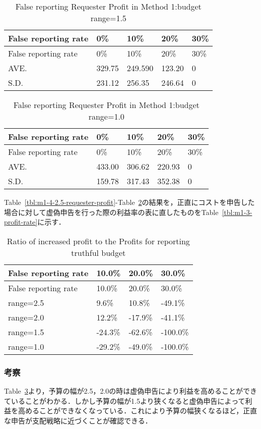 \hypertarget{tbl:m1-4ux20131.5-requester-profit}{}
\begin{longtable}[H]{@{}lllll@{}}
\caption{\label{tbl:m1-4ux20131.5-requester-profit}False reporting
Requester Profit in Method 1:budget range=1.5}\tabularnewline
\toprule
False reporting rate & 0\% & 10\% & 20\% & 30\%\tabularnewline
\midrule
\endfirsthead
\toprule
False reporting rate & 0\% & 10\% & 20\% & 30\%\tabularnewline
\midrule
\endhead
AVE. & 329.75 & 249.590 & 123.20 & 0\tabularnewline
S.D. & 231.12 & 256.35 & 246.64 & 0\tabularnewline
\bottomrule
\end{longtable}

\hypertarget{tbl:m1-4-1.0-requester-profit}{}
\begin{longtable}[H]{@{}lllll@{}}
\caption{\label{tbl:m1-4-1.0-requester-profit}False reporting Requester
Profit in Method 1:budget range=1.0}\tabularnewline
\toprule
False reporting rate & 0\% & 10\% & 20\% & 30\%\tabularnewline
\midrule
\endfirsthead
\toprule
False reporting rate & 0\% & 10\% & 20\% & 30\%\tabularnewline
\midrule
\endhead
AVE. & 433.00 & 306.62 & 220.93 & 0\tabularnewline
S.D. & 159.78 & 317.43 & 352.38 & 0\tabularnewline
\bottomrule
\end{longtable}

Table~\ref{tbl:m1-4-2.5-requester-profit}-Table~\ref{tbl:m1-4-1.0-requester-profit}の結果を，正直にコストを申告した場合に対して虚偽申告を行った際の利益率の表に直したものをTable~\ref{tbl:m1-3-profit-rate}に示す．

\hypertarget{tbl:m1-4-profit-rate}{}
\begin{longtable}[H]{@{}llll@{}}
\caption{\label{tbl:m1-4-profit-rate}Ratio of increased profit to the
Profits for reporting truthful budget}\tabularnewline
\toprule
False reporting rate & 10.0\% & 20.0\% & 30.0\%\tabularnewline
\midrule
\endfirsthead
\toprule
False reporting rate & 10.0\% & 20.0\% & 30.0\%\tabularnewline
\midrule
\endhead
range=2.5 & 9.6\% & 10.8\% & -49.1\%\tabularnewline
range=2.0 & 12.2\% & -17.9\% & -41.1\%\tabularnewline
range=1.5 & -24.3\% & -62.6\% & -100.0\%\tabularnewline
range=1.0 & -29.2\% & -49.0\% & -100.0\%\tabularnewline
\bottomrule
\end{longtable}

\hypertarget{ux8003ux5bdf-3}{%
\subsubsection{考察}\label{ux8003ux5bdf-3}}

Table~\ref{tbl:m1-4-profit-rate}より，予算の幅が2.5，2.0の時は虚偽申告により利益を高めることができていることがわかる．しかし予算の幅が1.5より狭くなると虚偽申告によって利益を高めることができなくなっている．これにより予算の幅狭くなるほど，正直な申告が支配戦略に近づくことが確認できる．

